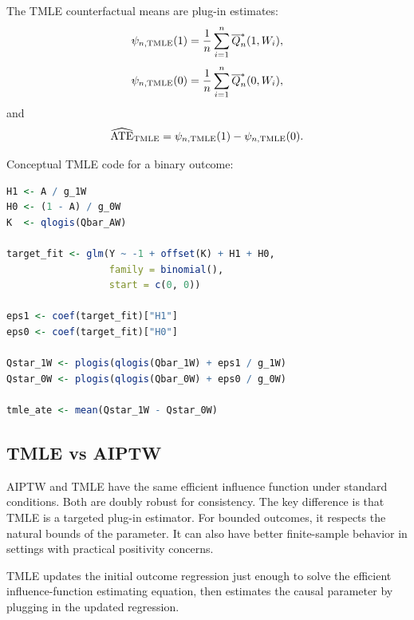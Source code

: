 The TMLE counterfactual means are plug-in estimates:
\[
\psi_{n,\operatorname{TMLE}}(1)
=
\frac{1}{n}\sum_{i=1}^n\overline{Q}_n^*(1,W_i),
\]
\[
\psi_{n,\operatorname{TMLE}}(0)
=
\frac{1}{n}\sum_{i=1}^n\overline{Q}_n^*(0,W_i),
\]
and
\[
\widehat{\operatorname{ATE}}_{\operatorname{TMLE}}
=
\psi_{n,\operatorname{TMLE}}(1)-\psi_{n,\operatorname{TMLE}}(0).
\]

\begin{implementationbox}
Conceptual TMLE code for a binary outcome:
\begin{lstlisting}[language=R]
H1 <- A / g_1W
H0 <- (1 - A) / g_0W
K  <- qlogis(Qbar_AW)

target_fit <- glm(Y ~ -1 + offset(K) + H1 + H0,
                  family = binomial(),
                  start = c(0, 0))

eps1 <- coef(target_fit)["H1"]
eps0 <- coef(target_fit)["H0"]

Qstar_1W <- plogis(qlogis(Qbar_1W) + eps1 / g_1W)
Qstar_0W <- plogis(qlogis(Qbar_0W) + eps0 / g_0W)

tmle_ate <- mean(Qstar_1W - Qstar_0W)
\end{lstlisting}
\end{implementationbox}

\subsection{TMLE vs AIPTW}

AIPTW and TMLE have the same efficient influence function under standard conditions.
Both are doubly robust for consistency. The key difference is that TMLE is a targeted
plug-in estimator. For bounded outcomes, it respects the natural bounds of the
parameter. It can also have better finite-sample behavior in settings with practical
positivity concerns.

\begin{keyidea}
TMLE updates the initial outcome regression just enough to solve the efficient
influence-function estimating equation, then estimates the causal parameter by
plugging in the updated regression.
\end{keyidea}
